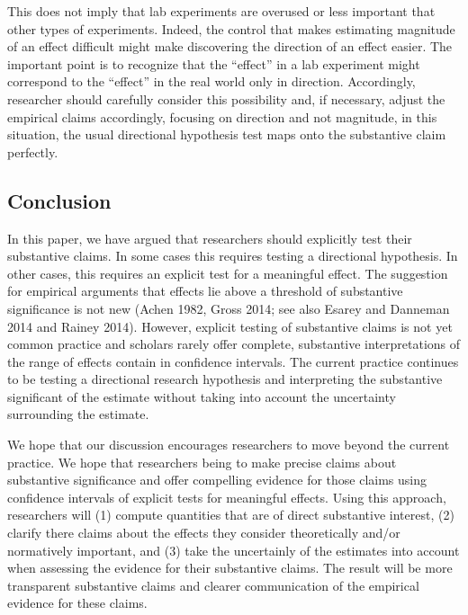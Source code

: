 \documentclass[12pt]{article}
\begin{document}
This does not imply that lab experiments are overused or less important that other types of experiments. Indeed, the control that makes estimating magnitude of an effect difficult might make discovering the direction of an effect easier. The important point is to recognize that the ``effect'' in a lab experiment might correspond to the ``effect'' in the real world only in direction. Accordingly, researcher should carefully consider this possibility and, if necessary, adjust the empirical claims accordingly, focusing on direction and not magnitude, in this situation, the usual directional hypothesis test maps onto the substantive claim perfectly.


\subsection*{Conclusion}

In this paper, we have argued that researchers should explicitly test their substantive claims. In some cases this requires testing a directional hypothesis. In other cases, this requires an explicit test for a meaningful effect. The suggestion for empirical arguments that effects lie above a threshold of substantive significance is not new (Achen 1982, Gross 2014; see also Esarey and Danneman 2014 and Rainey 2014). However, explicit testing of substantive claims is not yet common practice and scholars rarely offer complete, substantive interpretations of the range of effects contain in confidence intervals. The current practice continues to be testing a directional research hypothesis and interpreting the substantive significant of the estimate without taking into account the uncertainty surrounding the estimate. 

We hope that our discussion encourages researchers to move beyond the current practice. We hope that researchers being to make precise claims about substantive significance and offer compelling evidence for those claims using confidence intervals of explicit tests for meaningful effects. Using this approach, researchers will (1) compute quantities that are of direct substantive interest, (2) clarify there claims about the effects they consider theoretically and/or normatively important, and (3) take the uncertainly of the estimates into account when assessing the evidence for their substantive claims. The result will be more transparent substantive claims and clearer communication of the empirical evidence for these claims.

%
%
\end{document}
